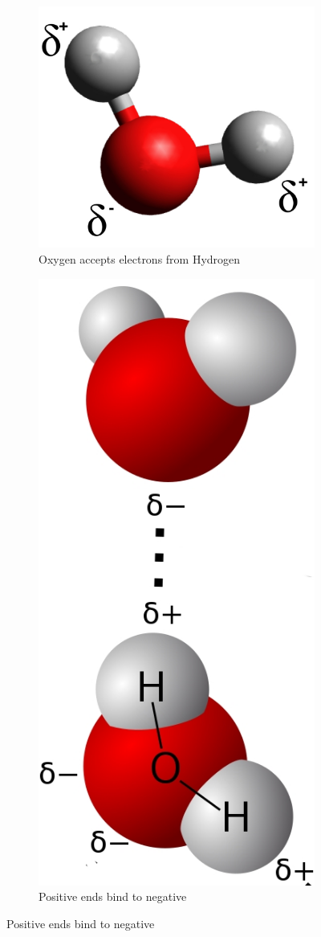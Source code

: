 \documentclass[]{article}
\begin{document}
\begin{figure}[H]
	\centering
		\caption{Very polar bonds can form hydrogen bonds} 
	\begin{subfigure}{.5\textwidth}
		\centering
		\includegraphics[width=.4\linewidth]{EnthalpyHydrogenBonds}
		\caption{Oxygen accepts electrons from Hydrogen}\label{fig:EnthalpyHydrogenBonds} 
	\end{subfigure}%
	\begin{subfigure}{.5\textwidth}
		\centering
		\includegraphics[width=.4\linewidth]{EnthalpyHydrogenBondMore}
		\caption{Positive ends bind to negative}\label{fig:EnthalpyHydrogenBonds1} 
	\end{subfigure}
\end{figure}
\end{document}
